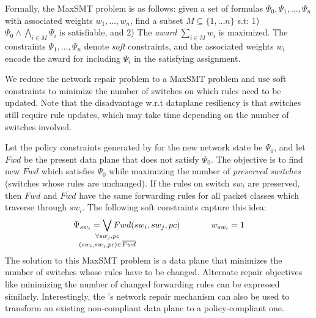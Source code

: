 Formally, the MaxSMT problem is as follows:
given a set of formulas $\Psi_0, \Psi_1, \ldots, \Psi_n$ with
associated weights $w_1, \ldots, w_n$, find a subset $M \subseteq \{1,
\ldots n\}$ s.t:
1) $\Psi_0 \wedge \bigwedge_{i \in M} \Psi_i$ is satisfiable, and 
2) The \emph{award} $\sum_{i \in M} w_i$  is maximized. 
The constraints $\Psi_1, \ldots, \Psi_n$ denote \emph{soft} constraints, and
the associated weights $w_i$ encode the award for including $\Psi_i$ in the satisfying
assignment. 

We reduce the network repair problem to a MaxSMT problem
and use soft constraints to minimize the number of 
switches on which rules need to be updated. Note that
the disadvantage w.r.t dataplane resiliency is that switches still
require rule updates, which may take time depending on the number of
switches involved.

 Let the policy constraints generated by \name for the new network
 state be $\Psi_0$, and let $\overline{Fwd}$ be the present data plane
 that does not satisfy $\Psi_0$. The objective is to find new $Fwd$
 which satisfies $\Psi_0$ while maximizing the number of \emph{preserved
   switches} (switches whose rules are unchanged). If the
 rules on switch $sw_i$ are preserved, then $Fwd$ and $\overline{Fwd}$
 have the same forwarding rules for all packet classes which traverse
 through $sw_i$. The following soft constraints capture this idea:
\begin{equation}
	\Psi_{sw_i} =  
	  \bigvee_{\mathclap{\substack{\forall sw_j, pc \\
			  		(sw_i, sw_j, pc) \in \overline{Fwd}}}} Fwd(sw_i, sw_j, pc) 
			~~~~~~~~~~~ 
			w_{sw_i}= 1
\end{equation}
The solution to this MaxSMT problem is a data plane that minimizes the number of
switches whose rules have to be changed.  Alternate repair objectives
like minimizing the number of changed forwarding rules can be
expressed similarly. Interestingly, the \name's network repair
mechanism can also be used to transform an existing
non-compliant data plane to a policy-compliant one.
